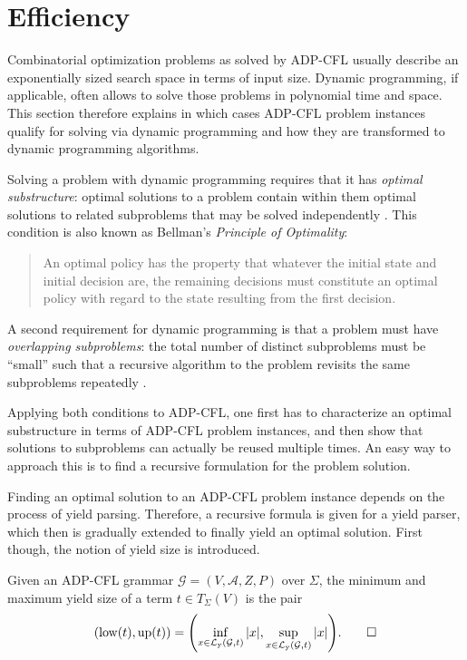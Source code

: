 \documentclass[
    a4paper,
    12pt,
    twoside,
    BCOR=12mm,
    parskip=half,
    chapterprefix,
    numbers=noenddot,
    bibliography=totoc
]{scrbook}
\begin{document}
\section{Efficiency}
\label{sec:adpcfl_efficiency}

Combinatorial optimization problems as solved by ADP-CFL usually describe an exponentially sized search space in terms of input size. Dynamic programming, if applicable, often allows to solve those problems in polynomial time and space. This section therefore explains in which cases ADP-CFL problem instances qualify for solving via dynamic programming and how they are transformed to dynamic programming algorithms.

Solving a problem with dynamic programming requires that it has \emph{optimal substructure}: optimal solutions to a problem contain within them optimal solutions to related subproblems that may be solved independently \citep[sect. 15.3]{cormen_introduction_2009}. This condition is also known as Bellman's \emph{Principle of Optimality}:

\blockquote[{\citealp[section 3.3]{bellman_dynamic_1957}}]{An optimal policy has the property that whatever the initial state and initial decision are, the remaining decisions must constitute an optimal policy with regard to the state resulting from the first decision.}

A second requirement for dynamic programming is that a problem must have \emph{overlapping subproblems}: the total number of distinct subproblems must be ``small'' such that a recursive algorithm to the problem revisits the same subproblems repeatedly \citep[sect. 15.3]{cormen_introduction_2009}.

Applying both conditions to ADP-CFL, one first has to characterize an optimal substructure in terms of ADP-CFL problem instances, and then show that solutions to subproblems can actually be reused multiple times. An easy way to approach this is to find a recursive formulation for the problem solution.

Finding an optimal solution to an ADP-CFL problem instance depends on the process of yield parsing. Therefore, a recursive formula is given for a yield parser, which then is gradually extended to finally yield an optimal solution. First though, the notion of yield size is introduced.

\begin{definition}
  \label{eq:yieldsizecfl}
	Given an ADP-CFL grammar $\mathcal{G}=(V,\mathcal{A},Z,P)$ over $\Sigma$, the minimum and maximum yield size of a term $t \in T_\Sigma(V)$ is the pair
	\begin{equation*}
		(\op{low}(t), \op{up}(t)) = \left(\inf_{x \in \mathcal{L}_\op{y}(\mathcal{G},t)} |x|, \sup_{x \in \mathcal{L}_\op{y}(\mathcal{G},t)} |x|\right).\qedhere
	\end{equation*}
\end{definition}
\end{document}
